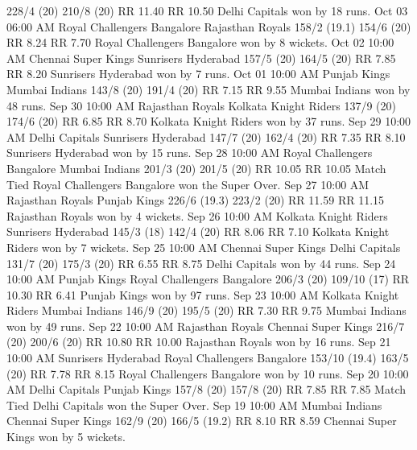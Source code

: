 228/4 (20)
210/8 (20)
RR 11.40
RR 10.50
Delhi Capitals won by 18 runs.
Oct 03
06:00 AM
Royal Challengers Bangalore
Rajasthan Royals
158/2 (19.1)
154/6 (20)
RR 8.24
RR 7.70
Royal Challengers Bangalore won by 8 wickets.
Oct 02
10:00 AM
Chennai Super Kings
Sunrisers Hyderabad
157/5 (20)
164/5 (20)
RR 7.85
RR 8.20
Sunrisers Hyderabad won by 7 runs.
Oct 01
10:00 AM
Punjab Kings
Mumbai Indians
143/8 (20)
191/4 (20)
RR 7.15
RR 9.55
Mumbai Indians won by 48 runs.
Sep 30
10:00 AM
Rajasthan Royals
Kolkata Knight Riders
137/9 (20)
174/6 (20)
RR 6.85
RR 8.70
Kolkata Knight Riders won by 37 runs.
Sep 29
10:00 AM
Delhi Capitals
Sunrisers Hyderabad
147/7 (20)
162/4 (20)
RR 7.35
RR 8.10
Sunrisers Hyderabad won by 15 runs.
Sep 28
10:00 AM
Royal Challengers Bangalore
Mumbai Indians
201/3 (20)
201/5 (20)
RR 10.05
RR 10.05
Match Tied Royal Challengers Bangalore won the Super Over.
Sep 27
10:00 AM
Rajasthan Royals
Punjab Kings
226/6 (19.3)
223/2 (20)
RR 11.59
RR 11.15
Rajasthan Royals won by 4 wickets.
Sep 26
10:00 AM
Kolkata Knight Riders
Sunrisers Hyderabad
145/3 (18)
142/4 (20)
RR 8.06
RR 7.10
Kolkata Knight Riders won by 7 wickets.
Sep 25
10:00 AM
Chennai Super Kings
Delhi Capitals
131/7 (20)
175/3 (20)
RR 6.55
RR 8.75
Delhi Capitals won by 44 runs.
Sep 24
10:00 AM
Punjab Kings
Royal Challengers Bangalore
206/3 (20)
109/10 (17)
RR 10.30
RR 6.41
Punjab Kings won by 97 runs.
Sep 23
10:00 AM
Kolkata Knight Riders
Mumbai Indians
146/9 (20)
195/5 (20)
RR 7.30
RR 9.75
Mumbai Indians won by 49 runs.
Sep 22
10:00 AM
Rajasthan Royals
Chennai Super Kings
216/7 (20)
200/6 (20)
RR 10.80
RR 10.00
Rajasthan Royals won by 16 runs.
Sep 21
10:00 AM
Sunrisers Hyderabad
Royal Challengers Bangalore
153/10 (19.4)
163/5 (20)
RR 7.78
RR 8.15
Royal Challengers Bangalore won by 10 runs.
Sep 20
10:00 AM
Delhi Capitals
Punjab Kings
157/8 (20)
157/8 (20)
RR 7.85
RR 7.85
Match Tied Delhi Capitals won the Super Over.
Sep 19
10:00 AM
Mumbai Indians
Chennai Super Kings
162/9 (20)
166/5 (19.2)
RR 8.10
RR 8.59
Chennai Super Kings won by 5 wickets.